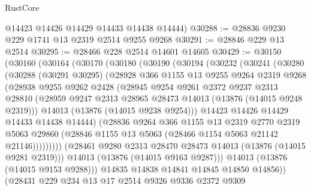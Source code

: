 \begin{lexlean}{RustCore}
\begin{coremodule}
      @14423
      @14426
      @14429
      @14433
      @14438
      @14444)
@30288 := @28836 @9230 @229 @1741 @13 @2319 @2514 @9255 @9268
@30291 := @28846 @229 @13 @2514
@30295 := @28466 @228 @2514 @14601 @14605
@30429 := @30150
    (@30160
      (@30164
        (@30170
          (@30180
            (@30190
              (@30194
                (@30232
                  (@30241
                    (@30280
                      (@30288
                        (@30291 @30295)
                        (@28928
                          @366
                          @1155
                          @13
                          @9255
                          @9264
                          @2319
                          @9268
                          (@28938
                            @9255
                            @9262
                            @2428
                            (@28945
                              @9254
                              @9261
                              @2372
                              @9237
                              @2313
                              @28810
                              (@28959
                                @9247
                                @2313
                                @28965
                                @28473
                                @14013
                                (@13876 (@14015 @9248 @2319)))
                              @14013
                              (@13876 (@14015 @9238 @9254)))
                            @14423
                            @14426
                            @14429
                            @14433
                            @14438
                            @14444)
                          (@28836
                            @9264
                            @366
                            @1155
                            @13
                            @2319
                            @2770
                            @2319
                            @5063
                            @29860
                            (@28846 @1155 @13 @5063 (@28466 @1154 @5063 @21142 @21146)))))))))
              (@28461 @9280 @2313 @28470 @28473 @14013 (@13876 (@14015 @9281 @2319)))
              @14013
              (@13876 (@14015 @9163 @9287)))
            @14013
            (@13876 (@14015 @9153 @9288)))
          @14835
          @14838
          @14841
          @14845
          @14850
          @14856))
      (@28431
        @229
        @234
        @13
        @17
        @2514
        @9326
        @9336
        @2372
        @9309

\end{coremodule}
\end{lexlean}
